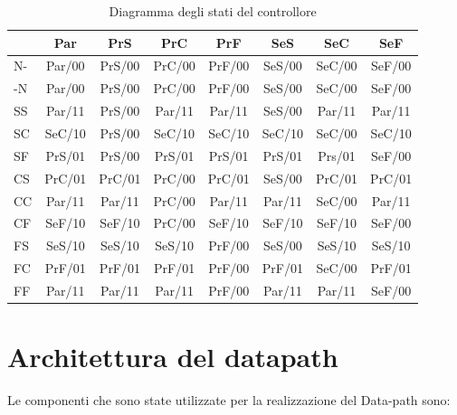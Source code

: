 \documentclass[a4paper]{article}
\begin{document}
\begin{table}[H]
	\centering
	{\renewcommand{\arraystretch}{2}%
		\begin{tabular}{l|c|c|c|c|c|c|c}
			   & Par    & PrS    & PrC    & PrF    & SeS    & SeC    & SeF    \\
			\hline
			N- & Par/00 & PrS/00 & PrC/00 & PrF/00 & SeS/00 & SeC/00 & SeF/00 \\
			\hline
			-N & Par/00 & PrS/00 & PrC/00 & PrF/00 & SeS/00 & SeC/00 & SeF/00 \\
			\hline
			SS & Par/11 & PrS/00 & Par/11 & Par/11 & SeS/00 & Par/11 & Par/11 \\
			\hline
			SC & SeC/10 & PrS/00 & SeC/10 & SeC/10 & SeC/10 & SeC/00 & SeC/10 \\
			\hline
			SF & PrS/01 & PrS/00 & PrS/01 & PrS/01 & PrS/01 & Prs/01 & SeF/00 \\
			\hline
			CS & PrC/01 & PrC/01 & PrC/00 & PrC/01 & SeS/00 & PrC/01 & PrC/01 \\
			\hline
			CC & Par/11 & Par/11 & PrC/00 & Par/11 & Par/11 & SeC/00 & Par/11 \\
			\hline
			CF & SeF/10 & SeF/10 & PrC/00 & SeF/10 & SeF/10 & SeF/10 & SeF/00 \\
			\hline
			FS & SeS/10 & SeS/10 & SeS/10 & PrF/00 & SeS/00 & SeS/10 & SeS/10 \\
			\hline
			FC & PrF/01 & PrF/01 & PrF/01 & PrF/00 & PrF/01 & SeC/00 & PrF/01 \\
			\hline
			FF & Par/11 & Par/11 & Par/11 & PrF/00 & Par/11 & Par/11 & SeF/00 \\
			\hline
		\end{tabular}}
	\caption{Diagramma degli stati del controllore}
\end{table}


\section{Architettura del datapath}
Le componenti che sono state utilizzate per la realizzazione del Data-path sono:
\end{document}
